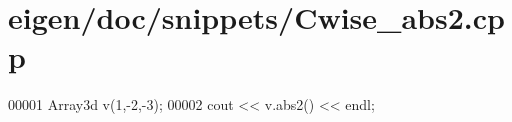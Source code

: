 \hypertarget{eigen_2doc_2snippets_2_cwise__abs2_8cpp_source}{}\section{eigen/doc/snippets/\+Cwise\+\_\+abs2.cpp}
\label{eigen_2doc_2snippets_2_cwise__abs2_8cpp_source}

\begin{DoxyCode}
00001 Array3d v(1,-2,-3);
00002 cout << v.abs2() << endl;
\end{DoxyCode}
